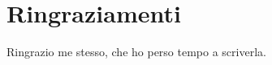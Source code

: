 \cleardoublepage


%

\begingroup

	\let\clearpage\relax
	\let\cleardoublepage\relax
	\let\cleardoublepage\relax
	
	\chapter*{Ringraziamenti}
		Ringrazio me stesso, che ho perso tempo a scriverla.

\endgroup